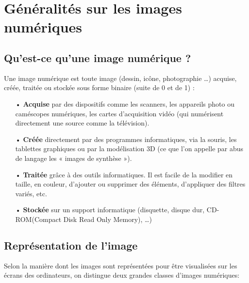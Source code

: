 \section{Généralités sur les images numériques}
    \subsection{Qu'est-ce qu'une image numérique ?}
    Une image numérique est toute image (dessin, icône, photographie …) acquise, créée, traitée ou stockée sous forme binaire (suite de 0 et de 1) :
    \begin{itemize}
        \item[•]\textbf{Acquise} par des dispositifs comme les scanners, les appareils photo ou caméscopes numériques, les cartes d’acquisition vidéo (qui numérisent directement une source comme la télévision).
        \item[•]\textbf{Créée} directement par des programmes informatiques, via la souris, les tablettes graphiques ou par la modélisation 3D (ce que l’on appelle par abus de langage les « images de synthèse »).
        \item[•]\textbf{Traitée} grâce à des outils informatiques. Il est facile de la modifier en taille, en couleur, d’ajouter ou supprimer des éléments, d’appliquer des filtres variés, etc.
        \item[•]\textbf{Stockée} sur un support informatique (disquette, disque dur, CD-ROM(Compact Disk Read Only Memory), …) \cite{wikiImage}
    \end{itemize}
    \subsection{Représentation de l'image}
    Selon la manière dont les images sont représentées pour être visualisées sur les écrans des ordinateurs, on distingue deux grandes classes d’images numériques:

